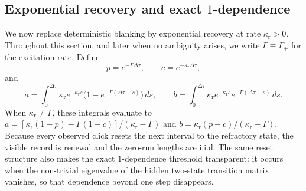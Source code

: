 \documentclass[11pt]{article}
\theoremstyle{definition}
\begin{document}
\subsection{Exponential recovery and exact \texorpdfstring{$1$}{1}-dependence}

We now replace deterministic blanking by exponential recovery at rate $\kappa_{\mathrm r}>0$. Throughout this section, and later when no ambiguity arises, we write $\Gamma\equiv\Gamma_+$ for the excitation rate. Define
\begin{equation}\label{eq:p-c-main}
p=e^{-\Gamma\Delta\tau}, \qquad c=e^{-\kappa_{\mathrm r}\Delta\tau},
\end{equation}
and
\begin{equation}\label{eq:a-b-main}
a=\int_0^{\Delta\tau}\kappa_{\mathrm r}e^{-\kappa_{\mathrm r}s}\bigl(1-e^{-\Gamma(\Delta\tau-s)}\bigr)\,ds,
\qquad
b=\int_0^{\Delta\tau}\kappa_{\mathrm r}e^{-\kappa_{\mathrm r}s}e^{-\Gamma(\Delta\tau-s)}\,ds.
\end{equation}
When $\kappa_{\mathrm r}\neq\Gamma$, these integrals evaluate to
$a=[\kappa_{\mathrm r}(1-p)-\Gamma(1-c)]/(\kappa_{\mathrm r}-\Gamma)$
and
$b=\kappa_{\mathrm r}(p-c)/(\kappa_{\mathrm r}-\Gamma)$.
Because every observed click resets the next interval to the refractory state, the visible record is renewal and the zero-run lengths are i.i.d. The same reset structure also makes the exact $1$-dependence threshold transparent: it occurs when the non-trivial eigenvalue of the hidden two-state transition matrix vanishes, so that dependence beyond one step disappears.
\end{document}
